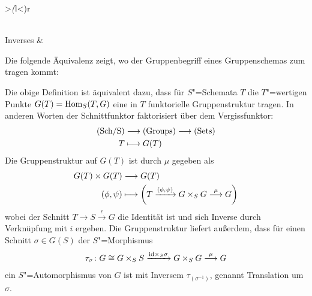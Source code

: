 \begin{Definition}[Gruppenschema]
\begin{tabular}{>{\itshape(}l<{)}r}
    \\[3.5em]
    Inverses
    &
  \end{tabular}
\end{Definition}
Die folgende Äquivalenz zeigt, wo der Gruppenbegriff eines
Gruppenschemas zum tragen kommt:
\begin{Bemerkung}
  Die obige Definition ist äquivalent dazu, dass für $S$"=Schemata $T$
  die $T$"=wertigen Punkte $G(T)=\operatorname{Hom}_S(T,G)$ eine in $T$ funktorielle
  Gruppenstruktur tragen.
  In anderen Worten der Schnittfunktor faktorisiert über dem
  Vergissfunktor:
  \begin{align*}
    \Sch &\longto \Groups \longto \text{(Sets)}\\
    T &\longmapsto G(T)
  \end{align*}
  Die Gruppenstruktur auf $G(T)$ ist durch $\mu$ gegeben als
  \begin{align*}
    G(T)\times G(T) &\longto G(T)\\
    (\phi, \psi) &\longmapsto 
                   \left(
                   T\xrightarrow{(\phi,\psi)} G\times_S G
                   \overset{\mu}\longto G
                   \right)
  \end{align*}
  wobei der Schnitt $T\to S\xrightarrow{\epsilon} G$ die
  Identität ist und sich Inverse durch Verknüpfung mit $i$ ergeben.
  Die Gruppenstruktur liefert außerdem, dass für einen Schnitt
  $\sigma\in G(S)$ der $S$"=Morphismus
  \begin{gather*}
    \tau_\sigma\colon G\cong G\times_S S
    \xrightarrow{\mathrm{id}\times_S\sigma}
    G\times_S G
    \overset{\mu}{\longrightarrow} G
  \end{gather*}
  ein $S$"=Automorphismus von $G$ ist mit Inversem
  $\tau_{(\sigma^{-1})}$, genannt Translation um $\sigma$.
\end{Bemerkung}

